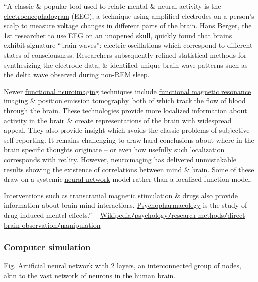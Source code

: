 \documentclass[oneside]{book}
\numberwithin{equation}{section}
\begin{document}
``A classic \& popular tool used to relate mental \& neural activity is the \href{https://en.wikipedia.org/wiki/Electroencephalogram}{electroencephalogram} (EEG), a technique using amplified electrodes on a person's scalp to measure voltage changes in different parts of the brain. \href{https://en.wikipedia.org/wiki/Hans_Berger}{Hans Berger}, the 1st researcher to use EEG on an unopened skull, quickly found that brains exhibit signature ``brain waves'': electric oscillations which correspond to different states of consciousness. Researchers subsequently refined statistical methods for synthesizing the electrode data, \& identified unique brain wave patterns such as the \href{https://en.wikipedia.org/wiki/Delta_wave}{delta wave} observed during non-REM sleep.

Newer \href{https://en.wikipedia.org/wiki/Functional_neuroimaging}{functional neuroimaging} techniques include \href{https://en.wikipedia.org/wiki/Functional_magnetic_resonance_imaging}{functional magnetic resonance imaging} \& \href{https://en.wikipedia.org/wiki/Positron_emission_tomography}{position emission tomography}, both of which track the flow of blood through the brain. These technologies provide more localized information about activity in the brain \& create representations of the brain with widespread appeal. They also provide insight which avoids the classic problems of subjective self-reporting. It remains challenging to draw hard conclusions about where in the brain specific thoughts originate -- or even how usefully such localization corresponds with reality. However, neuroimaging has delivered unmistakable results showing the existence of correlations between mind \& brain. Some of these draw on a systemic \href{https://en.wikipedia.org/wiki/Neural_network}{neural network} model rather than a localized function model.

Interventions such as \href{https://en.wikipedia.org/wiki/Transcranial_magnetic_stimulation}{transcranial magnetic stimulation} \& drugs also provide information about brain-mind interactions. \href{https://en.wikipedia.org/wiki/Psychopharmacology}{Psychopharmacology} is the study of drug-induced mental effects.'' -- \href{https://en.wikipedia.org/wiki/Psychology#Direct_brain_observation/manipulaiton}{Wikipedia\texttt{/}psychology\texttt{/}research methods\texttt{/}direct brain observation\texttt{/}manipulation}

\subsubsection{Computer simulation}
\textsf{Fig. \href{https://en.wikipedia.org/wiki/Artificial_neural_network}{Artificial neural network} with 2 layers, an interconnected group of nodes, akin to the vast network of neurons in the human brain.}
\end{document}
